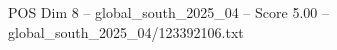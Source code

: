 \begin{textsample}{POS Dim 8 – global\_south\_2025\_04 – Score 5.00 – global\_south\_2025\_04/123392106.txt}
\end{textsample}
